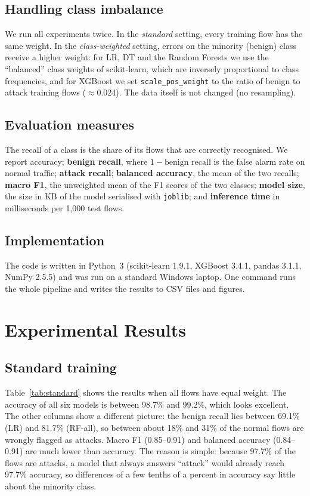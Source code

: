 \documentclass[runningheads]{llncs}
\begin{document}
\subsection{Handling class imbalance}
We run all experiments twice. In the \emph{standard} setting, every training flow has the same weight. In the \emph{class-weighted} setting, errors on the minority (benign) class receive a higher weight: for LR, DT and the Random Forests we use the ``balanced'' class weights of scikit-learn, which are inversely proportional to class frequencies, and for XGBoost we set \texttt{scale\_pos\_weight} to the ratio of benign to attack training flows ($\approx$0.024). The data itself is not changed (no resampling).

\subsection{Evaluation measures}
The recall of a class is the share of its flows that are correctly recognised. We report accuracy; \textbf{benign recall}, where $1-\text{benign recall}$ is the false alarm rate on normal traffic; \textbf{attack recall}; \textbf{balanced accuracy}, the mean of the two recalls; \textbf{macro F1}, the unweighted mean of the F1 scores of the two classes; \textbf{model size}, the size in KB of the model serialised with \texttt{joblib}; and \textbf{inference time} in milliseconds per 1,000 test flows.

\subsection{Implementation}
The code is written in Python~3 (scikit-learn 1.9.1, XGBoost 3.4.1, pandas 3.1.1, NumPy 2.5.5) and was run on a standard Windows laptop. One command runs the whole pipeline and writes the results to CSV files and figures.

\section{Experimental Results}
\label{sec:results}

\subsection{Standard training}
Table~\ref{tab:standard} shows the results when all flows have equal weight. The accuracy of all six models is between 98.7\% and 99.2\%, which looks excellent. The other columns show a different picture: the benign recall lies between 69.1\% (LR) and 81.7\% (RF-all), so between about 18\% and 31\% of the normal flows are wrongly flagged as attacks. Macro F1 (0.85--0.91) and balanced accuracy (0.84--0.91) are much lower than accuracy. The reason is simple: because 97.7\% of the flows are attacks, a model that always answers ``attack'' would already reach 97.7\% accuracy, so differences of a few tenths of a percent in accuracy say little about the minority class.
\end{document}

